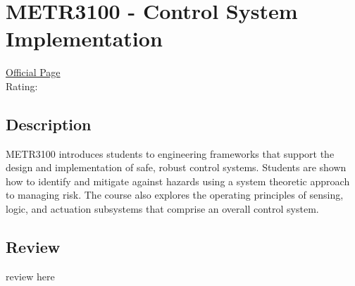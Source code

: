 \hypertarget{METR3100}{\section{METR3100 - Control System Implementation}}

\large
\textcolor{turbo_purple}{\href{https://my.uq.edu.au/programs-courses/course.html?course_code=METR3100}{Official Page}} \\
Rating: \cstar\cstar\cstar\cstar\ostar

\normalsize
\subsection*{Description}
METR3100 introduces students to engineering frameworks that support the design and implementation of safe, robust control systems.
Students are shown how to identify and mitigate against hazards using a system theoretic approach to managing risk.
The course also explores the operating principles of sensing, logic, and actuation subsystems that comprise an overall control system.

\subsection*{Review}
review here
